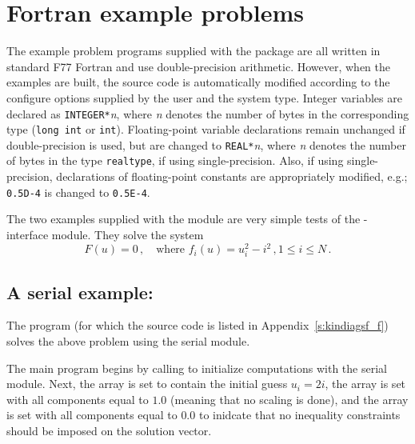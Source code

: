 \section{Fortran example problems}\label{s:ex_fortran}

The {\F} example problem programs supplied with the {\kinsol}
package are all written in standard F77 Fortran and use double-precision
arithmetic. However, when the {\F} examples are built, the source code is
automatically modified according to the configure options supplied by the
user and the system type. Integer variables are declared as {\tt INTEGER*}{\em n},
where {\em n} denotes the number of bytes in the corresponding {\C} type
({\tt long int} or {\tt int}). Floating-point variable declarations remain
unchanged if double-precision is used, but are changed to {\tt REAL*}{\em n},
where {\em n} denotes the number of bytes in the {\sundials} type {\tt realtype},
if using single-precision. Also, if using single-precision, declarations of
floating-point constants are appropriately modified, e.g.; {\tt 0.5D-4} is
changed to {\tt 0.5E-4}.


The two examples supplied with the {\fkinsol} module are very simple tests 
of the {\F}-{\C} interface module. 
They solve the system
\begin{equation*}
  F(u) = 0 \, , \quad \text{where } f_i(u) = u_i^2 - i^2 \, , 1 \le i \le N \, . 
\end{equation*}

\subsection{A serial example: }\label{ss:kindiagsf}

The  program (for which the source code is listed in
Appendix~\ref{s:kindiagsf_f}) solves the above problem using the serial
{\nvecs} module.

The main program begins by calling  to initialize computations
with the serial {\nvecs} module. Next, the array  is set to contain
the initial guess $u_i = 2 i$, the array  is set with all 
components equal to $1.0$ (meaning that no scaling is done), and the array
 is set with all components equal to $0.0$ to inidcate that no 
inequality constraints should be imposed on the solution vector.

